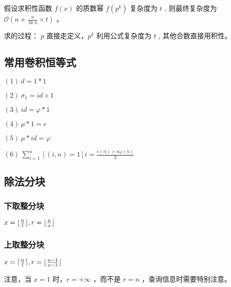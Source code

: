 假设求积性函数 $f(x)$ 的质数幂 $f\left(p^k\right)$ 复杂度为 $t$ , 则最终复杂度为 $\mathcal{O}\left(n+\frac{n}{\ln n} \times t\right)$ 。

求的过程： $p$ 直接走定义，$p^k$ 利用公式复杂度为 $t$ , 其他合数直接用积性。



\subsection{常用卷积恒等式}

  $(1)\ d=1\ast 1$ 

  $(2)\ \sigma_{1}=id\times 1$ 

  $(3)\ id=\varphi \ast 1$ 

  $(4)\ \mu\ast 1=e$

  $(5)\ \mu \ast id=\varphi$

  $(6)\ \sum_{i=1}^n [(i, n) = 1] i = \displaystyle\frac{e(n)+n\varphi(n)}{2}$

\subsection{除法分块}

\subsubsection*{下取整分块}

$x=\lfloor{n\over l}\rfloor,r=\lfloor{n\over x}\rfloor$

\subsubsection*{上取整分块}

$x=\lceil{n\over l}\rceil,r=\lfloor{n-1\over x-1}\rfloor$

注意，当 $x=1$ 时，$r=+\infty$ ，而不是 $r=n$ ，查询信息时需要特别注意。
